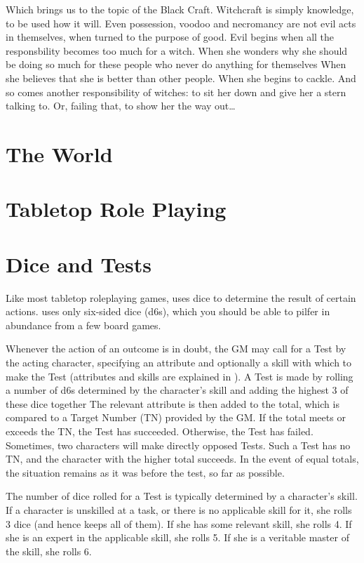 Which brings us to the topic of the Black Craft.
Witchcraft is simply knowledge, to be used how it will.
Even possession, voodoo and necromancy are not evil acts in themselves, when turned to the purpose of good.
Evil begins when all the responsbility becomes too much for a witch.
When she wonders why she should be doing so much for these people who never do anything for themselves
When she believes that she is better than other people.
When she begins to cackle.
And so comes another responsibility of witches: to sit her down and give her a stern talking to.
Or, failing that, to show her the way out\dots

\section{The World}


\section{Tabletop Role Playing}

\section{Dice and Tests}

Like most tabletop roleplaying games,  uses dice to determine the result of certain actions.
 uses only six-sided dice (d6s), which you should be able to pilfer in abundance from a few board games.

Whenever the action of an outcome is in doubt, the GM may call for a Test by the acting character, specifying an attribute and optionally a skill with which to make the Test (attributes and skills are explained in ).
A Test is made by rolling a number of d6s determined by the character's skill and adding the highest 3 of these dice together
The relevant attribute is then added to the total, which is compared to a Target Number (TN) provided by the GM.
If the total meets or exceeds the TN, the Test has succeeded.
Otherwise, the Test has failed.
Sometimes, two characters will make directly opposed Tests.
Such a Test has no TN, and the character with the higher total succeeds.
In the event of equal totals, the situation remains as it was before the test, so far as possible.

The number of dice rolled for a Test is typically determined by a character's skill.
If a character is unskilled at a task, or there is no applicable skill for it, she rolls 3 dice (and hence keeps all of them).
If she has some relevant skill, she rolls 4.
If she is an expert in the applicable skill, she rolls 5.
If she is a veritable master of the skill, she rolls 6.

